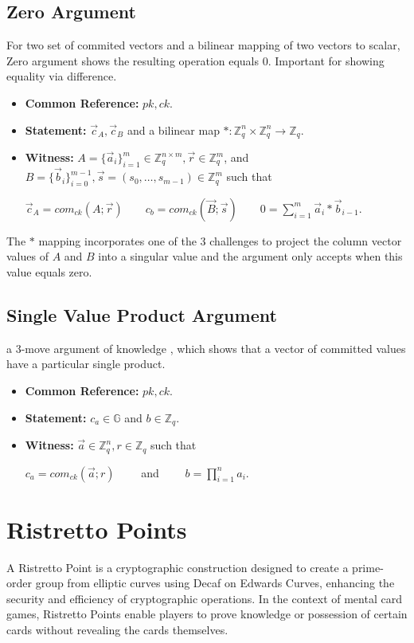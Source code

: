 \documentclass[12pt,a4paper]{report}
\begin{document}
\subsection*{Zero Argument} For two set of commited vectors and a bilinear mapping of two vectors to scalar, Zero argument shows the resulting operation equals $0$. 
Important for showing equality via difference.
\begin{itemize}
	\item \textbf{Common Reference:} $pk, ck$.
	\item \textbf{Statement:} $\vec{c}_A, \vec{c}_B$ and a bilinear map $*: \mathbb{Z}_q^n \times \mathbb{Z}_q^n \rightarrow \mathbb{Z}_q$.
	\item \textbf{Witness:} $A = \{\vec{a}_i\}_{i=1}^m \in \mathbb{Z}^{n \times m}_q, \vec{r} \in \mathbb{Z}_q^m$, and $B = \{\vec{b}_i\}_{i=0}^{m-1}, \vec{s} = (s_0,\ldots,s_{m-1}) \in \mathbb{Z}_q^m$ such that
		\begin{center}
			$\displaystyle \vec{c}_A = com_{ck}(A; \vec{r}) \qquad c_b = com_{ck}(\vec{B}; \vec{s}) \qquad 0 = \sum_{i=1}^m \vec{a}_i * \vec{b}_{i-1}$.
		\end{center}
\end{itemize}
The $*$ mapping incorporates one of the 3 challenges to project the column vector values of $A$ and $B$ into a singular value and the argument only accepts when this value equals zero.
\subsection*{Single Value Product Argument} a 3-move argument of knowledge \cite{gro10}, which shows that a vector of committed values have a particular single product.
\begin{itemize}
	\item \textbf{Common Reference:} $pk, ck$.
	\item \textbf{Statement:} $c_a \in \mathbb{G}$ and $b \in \mathbb{Z}_q$.
	\item \textbf{Witness:} $\vec{a} \in \mathbb{Z}_q^n, r \in \mathbb{Z}_q$ such that
		\begin{center}
			$c_a = com_{ck}(\vec{a};r) \qquad$ and $\displaystyle \qquad b = \prod_{i=1}^n a_i$.
		\end{center}
\end{itemize}

\section{Ristretto Points}
A Ristretto Point is a cryptographic construction designed to create a
prime-order group from elliptic curves using Decaf \cite{decaf} on Edwards Curves, 
enhancing the security and efficiency of cryptographic operations. 
In the context of mental card games, Ristretto Points 
enable players to prove knowledge or 
possession of certain cards without revealing the cards themselves.
\end{document}
